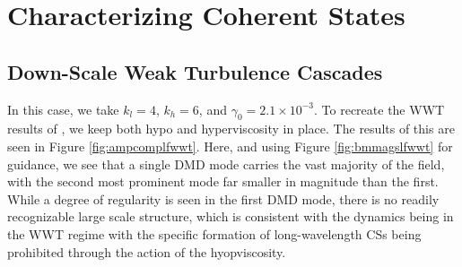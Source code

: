 \documentclass[a4paper,11pt]{article}
\begin{document}
\section*{Characterizing Coherent States}

\subsection*{Down-Scale Weak Turbulence Cascades}
In this case, we take $k_{l}=4$, $k_{h}=6$, and $\gamma_{0}=2.1\times 10^{-3}$.  To recreate the WWT results of \cite{nazarenko2}, we keep both hypo and hyperviscosity in place.  The results of this are seen in Figure \ref{fig:ampcomplfwwt}.    Here, and using Figure \ref{fig:bmmagslfwwt} for guidance, we see that a single DMD mode carries the vast majority of the field, with the second most prominent mode far smaller in magnitude than the first.  While a degree of regularity is seen in the first DMD mode, there is no readily recognizable large scale structure, which is consistent with the dynamics being in the WWT regime with the specific formation of long-wavelength CSs being prohibited through the action of the hyopviscosity.
\end{document}
